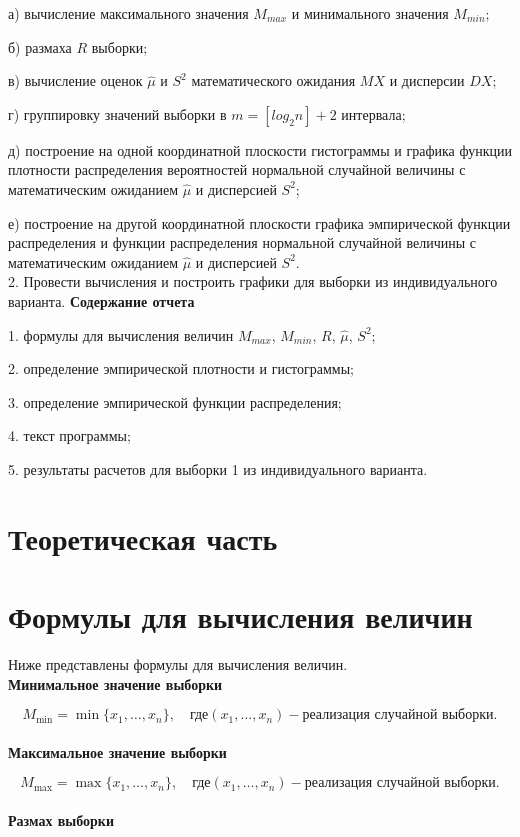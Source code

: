  а) вычисление максимального значения $M_{max}$ и минимального значения $M_{min}$;

	б) размаха $R$ выборки;

	в) вычисление оценок $\hat\mu$ и $S^2$ математического ожидания $MX$ и дисперсии $DX$;
	
	г) группировку значений выборки в $m = [log_2 n] + 2$ интервала;
	
	д) построение на одной координатной плоскости гистограммы и графика функции плотности распределения вероятностей нормальной случайной величины с математическим
	ожиданием $\hat\mu$ и дисперсией $S^2$;
	
е) построение на другой координатной плоскости графика эмпирической функции распределения и функции распределения нормальной случайной величины с математическим
ожиданием $\hat\mu$ и дисперсией $S^2$.
\\
2. Провести вычисления и построить графики для выборки из индивидуального варианта.
\textbf{Содержание отчета}

1. формулы для вычисления величин $M_{max}$, $M_{min}$, $R$, $\hat\mu$, $S^2$;

2. определение эмпирической плотности и гистограммы;

3. определение эмпирической функции распределения;

4. текст программы;

5. результаты расчетов для выборки 1 из индивидуального варианта.

\section*{Теоретическая часть}

\section*{Формулы для вычисления величин}
Ниже представлены формулы для вычисления величин.
\\
\textbf{Минимальное значение выборки}

\begin{equation}
M_{\min} = \min \{ x_1, \dots, x_n\}, \quad \text{где} (x_1, \dots, x_n) - \text{реализация случайной выборки.}
\end{equation}
\\ \textbf{Максимальное значение выборки}

\begin{equation}
M_{\max} = \max \{ x_1, \dots, x_n\}, \quad \text{где} (x_1, \dots, x_n) - \text{реализация случайной выборки.}
\end{equation}
\\ \textbf{Размах выборки}

